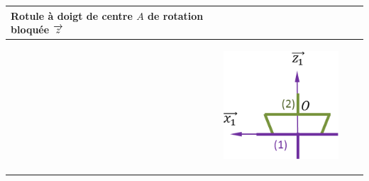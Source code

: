 \documentclass[10pt]{article}
\begin{document}
\begin{center}
\begin{longtable}{|p{}|p{}|p{}|p{}|}
Rotule à doigt de centre $A$ de rotation bloquée $\overrightarrow{z}$ &  \vspace{3cm} & & \\ \hline
&\begin{center} \includegraphics[width=.17\textwidth]{images/rectiligne_2d_2}\end{center} &  & \\ \hline
\end{longtable}
\end{center}
\end{document}
